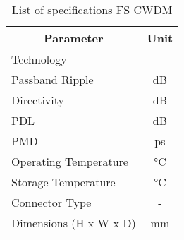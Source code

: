 \begin{table}[!ht]
	\centering
	\cite{noauthor_4ch_nodate}
	\begin{tabular} {|l|c|}
		\hline
		\multicolumn{1}{|c|}{\textbf{Parameter}} & \textbf{Unit} \\ \hline\hline
		Technology & - \\ \hline
		Passband Ripple & \unit{\dB} \\ \hline
		Directivity & \unit{\dB} \\ \hline
		PDL & \unit{\dB} \\ \hline
		PMD & \unit{\ps} \\ \hline
		Operating Temperature & \unit{\degreeCelsius} \\ \hline
		Storage Temperature & \unit{\degreeCelsius} \\ \hline
		Connector Type & - \\ \hline
		Dimensions (H x W x D) & \unit{\mm} \\ \hline
	\end{tabular}
	\caption{List of specifications FS CWDM}
	\label{table:specs2}
\end{table}

